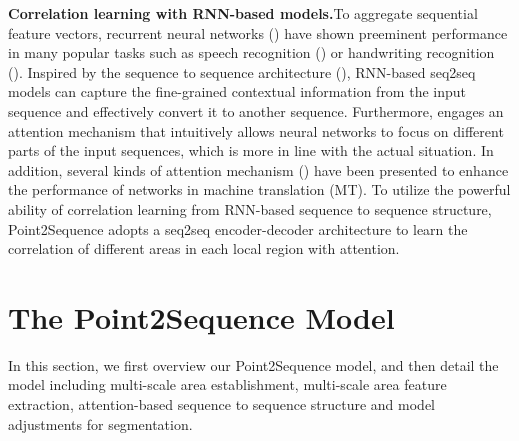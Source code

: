 \documentclass[letterpaper]{article}
\begin{document}
\noindent
\newline
\textbf{Correlation learning with RNN-based models.}\quad To aggregate sequential feature vectors, recurrent neural networks (\citealt{elman1990finding}) have shown preeminent performance in many popular tasks such as speech recognition (\citealt{li2015constructing}) or  handwriting recognition (\citealt{bertolami2009novel}).
Inspired by the sequence to sequence architecture (\citealt{cho2014learning}), RNN-based seq2seq models can capture the fine-grained contextual information from the input sequence and effectively convert it to another sequence.
Furthermore, \citet{sutskever2014sequence} engages an attention mechanism that intuitively allows neural networks to focus on different parts of the input sequences, which is more in line with the actual situation.
In addition, several kinds of attention mechanism (\citealt{bahdanau2014neural,luong2015effective}) have been presented to enhance the performance of networks in machine translation (MT). 
To utilize the powerful ability of correlation learning from RNN-based sequence to sequence structure, Point2Sequence adopts a seq2seq encoder-decoder architecture to learn the correlation of different areas in each local region with attention. 


\section{The Point2Sequence Model}
In this section, we first overview our Point2Sequence model, and then detail the model including multi-scale area establishment, multi-scale area feature extraction, attention-based sequence to sequence structure and model adjustments for segmentation. 
\end{document}
